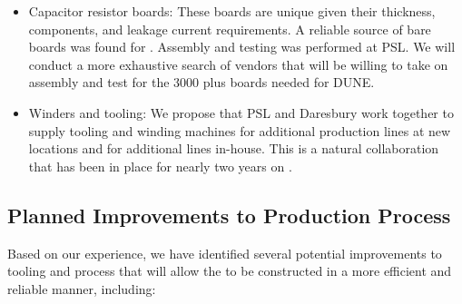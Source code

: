 \begin{itemize}
\item Capacitor resistor boards: These boards are unique given their thickness, 
 components, and leakage current requirements. A reliable source of bare boards was found for . Assembly and testing was performed at PSL. We will conduct a more exhaustive search of vendors that will be willing to take on assembly and test for the \num{3000} plus boards needed for DUNE.

\item Winders and tooling: We propose that PSL and Daresbury work together to supply tooling and winding machines for additional production lines at new locations and for additional lines in-house. This is a natural collaboration that has been in place for nearly two years on .

\end{itemize}


\subsection{Planned Improvements to Production Process}

Based on our  experience, we have identified several potential improvements to tooling and process that will allow the  to be constructed in a more efficient and reliable manner, including:


